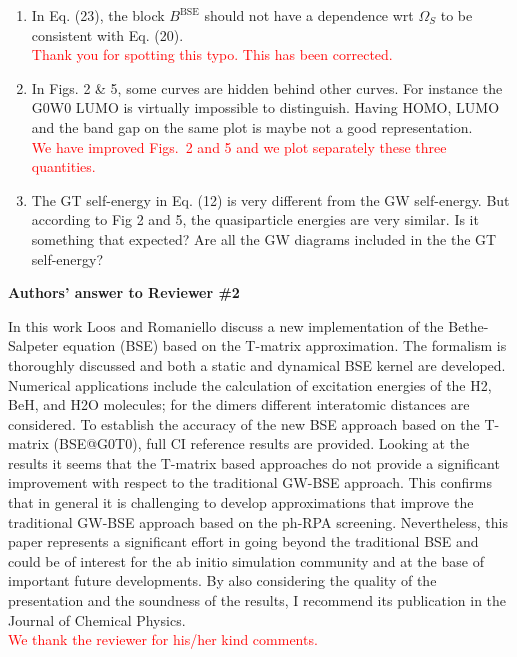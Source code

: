 \documentclass[10pt]{letter}
\newcommand{\alert}[1]{\textcolor{red}{#1}}
\begin{document}
\begin{letter}
\begin{enumerate}
\item 
{In Eq. (23), the block $B^\text{BSE}$ should not have a dependence wrt $\Omega_S$ to be consistent with Eq. (20).}
\\
\alert{
Thank you for spotting this typo. 
This has been corrected.
}

\item 
{In Figs. 2 \& 5, some curves are hidden behind other curves. For instance the G0W0 LUMO is virtually impossible to distinguish. 
Having HOMO, LUMO and the band gap on the same plot is maybe not a good representation.}
\\
\alert{
We have improved Figs.~2 and 5 and we plot separately these three quantities.
}

\item 
{The GT self-energy in Eq. (12) is very different from the GW self-energy. 
But according to Fig 2 and 5, the quasiparticle energies are very similar. 
Is it something that expected? 
Are all the GW diagrams included in the the GT self-energy?}
\\
\alert{
}

\end{enumerate}

\noindent \textbf{\large Authors' answer to Reviewer \#2}

{In this work Loos and Romaniello discuss a new implementation of the Bethe-Salpeter equation (BSE) based on the T-matrix approximation. 
The formalism is thoroughly discussed and both a static and dynamical BSE kernel are developed. 
Numerical applications include the calculation of excitation energies of the H2, BeH, and H2O molecules; for the dimers different interatomic distances are considered. 
To establish the accuracy of the new BSE approach based on the T-matrix (BSE@G0T0), full CI reference results are provided. 
Looking at the results it seems that the T-matrix based approaches do not provide a significant improvement with respect to the traditional GW-BSE approach. 
This confirms that in general it is challenging to develop approximations that improve the traditional GW-BSE approach based on the ph-RPA screening. 
Nevertheless, this paper represents a significant effort in going beyond the traditional BSE and could be of interest for the ab initio simulation community and at the base of important future developments. 
By also considering the quality of the presentation and the soundness of the results, I recommend its publication in the Journal of Chemical Physics.}
\\
\alert{
We thank the reviewer for his/her kind comments.
}


\end{letter}
\end{document}
